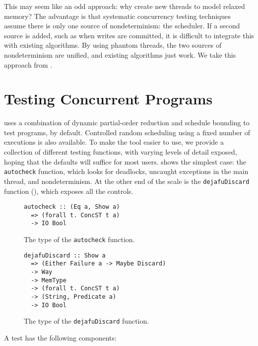 This may seem like an odd approach: why create new threads to model relaxed
memory?  The advantage is that systematic concurrency testing techniques assume
there is only one source of nondeterminism: the scheduler.  If a second source
is added, such as when writes are committed, it is difficult to integrate this
with existing algorithms.  By using phantom threads, the two sources of
nondeterminism are unified, and existing algorithms just work.  We take this
approach from \cite{zhang2015}.

\section{Testing Concurrent Programs}
\label{sec:dejafu-testing}

\dejafu{} uses a combination of dynamic partial-order reduction and
schedule bounding to test programs, by default.  Controlled random
scheduling using a fixed number of executions is also available.  To
make the tool easier to use, we provide a collection of different
testing functions, with varying levels of detail exposed, hoping that
the defaults will suffice for most users.   shows
the simplest case: the \verb|autocheck| function, which looks for
deadlocks, uncaught exceptions in the main thread, and nondeterminism.
At the other end of the scale is the \verb|dejafuDiscard| function
(), which exposes all the controls.

\begin{figure}[t]
  \centering
  \begin{lstlisting}
autocheck :: (Eq a, Show a)
  => (forall t. ConcST t a)
  -> IO Bool
  \end{lstlisting}
  \caption{The type of the \texttt{autocheck} function.}
  \label{fig:autocheck}
\end{figure}

\begin{figure}[t]
  \centering
  \begin{lstlisting}
dejafuDiscard :: Show a
  => (Either Failure a -> Maybe Discard)
  -> Way
  -> MemType
  -> (forall t. ConcST t a)
  -> (String, Predicate a)
  -> IO Bool
  \end{lstlisting}
  \caption{The type of the \texttt{dejafuDiscard} function.}
  \label{fig:dejafuDiscard}
\end{figure}

A \dejafu{} test has the following components:

